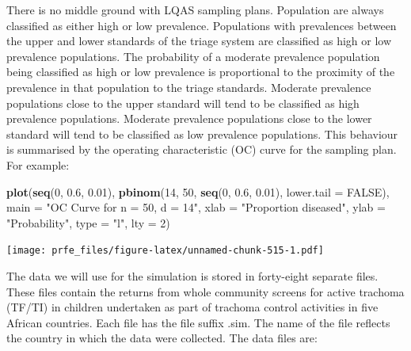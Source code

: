 \documentclass[12pt,a4paper]{book}
\newenvironment{Shaded}{\begin{snugshade}}{\end{snugshade}}
\newcommand{\DataTypeTok}[1]{\textcolor[rgb]{0.13,0.29,0.53}{#1}}
\newcommand{\DecValTok}[1]{\textcolor[rgb]{0.00,0.00,0.81}{#1}}
\newcommand{\FloatTok}[1]{\textcolor[rgb]{0.00,0.00,0.81}{#1}}
\newcommand{\KeywordTok}[1]{\textcolor[rgb]{0.13,0.29,0.53}{\textbf{#1}}}
\newcommand{\NormalTok}[1]{#1}
\newcommand{\OtherTok}[1]{\textcolor[rgb]{0.56,0.35,0.01}{#1}}
\newcommand{\StringTok}[1]{\textcolor[rgb]{0.31,0.60,0.02}{#1}}
\theoremstyle{definition}
\theoremstyle{definition}
\theoremstyle{definition}
\theoremstyle{remark}
\begin{document}
There is no middle ground with LQAS sampling plans. Population are
always classified as either high or low prevalence. Populations with
prevalences between the upper and lower standards of the triage system
are classified as high or low prevalence populations. The probability of
a moderate prevalence population being classified as high or low
prevalence is proportional to the proximity of the prevalence in that
population to the triage standards. Moderate prevalence populations
close to the upper standard will tend to be classified as high
prevalence populations. Moderate prevalence populations close to the
lower standard will tend to be classified as low prevalence populations.
This behaviour is summarised by the operating characteristic (OC) curve
for the sampling plan. For example:

\begin{Shaded}
\begin{Highlighting}[]
\KeywordTok{plot}\NormalTok{(}\KeywordTok{seq}\NormalTok{(}\DecValTok{0}\NormalTok{, }\FloatTok{0.6}\NormalTok{, }\FloatTok{0.01}\NormalTok{),}
     \KeywordTok{pbinom}\NormalTok{(}\DecValTok{14}\NormalTok{, }\DecValTok{50}\NormalTok{, }\KeywordTok{seq}\NormalTok{(}\DecValTok{0}\NormalTok{, }\FloatTok{0.6}\NormalTok{, }\FloatTok{0.01}\NormalTok{), }\DataTypeTok{lower.tail =} \OtherTok{FALSE}\NormalTok{),}
     \DataTypeTok{main =} \StringTok{"OC Curve for n = 50, d = 14"}\NormalTok{,}
     \DataTypeTok{xlab =} \StringTok{"Proportion diseased"}\NormalTok{,}
     \DataTypeTok{ylab =} \StringTok{"Probability"}\NormalTok{,}
     \DataTypeTok{type =} \StringTok{"l"}\NormalTok{, }\DataTypeTok{lty =} \DecValTok{2}\NormalTok{)}
\end{Highlighting}
\end{Shaded}

\texttt{[image: prfe\_files/figure-latex/unnamed-chunk-515-1.pdf]}

The data we will use for the simulation is stored in forty-eight
separate files. These files contain the returns from whole community
screens for active trachoma (TF/TI) in children undertaken as part of
trachoma control activities in five African countries. Each file has the
file suffix .sim. The name of the file reflects the country in which the
data were collected. The data files are:
\end{document}
